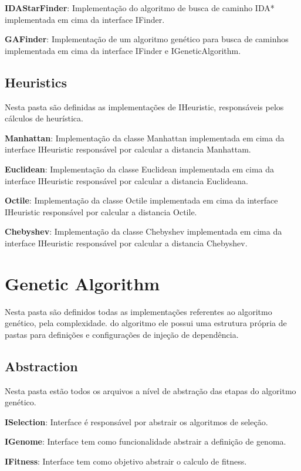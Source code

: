  \textbf{IDAStarFinder}: Implementação do algoritmo de busca de caminho IDA* implementada em cima da interface IFinder.
 
 \textbf{GAFinder}: Implementação de um algoritmo genético para busca de caminhos implementada em cima da interface IFinder e IGeneticAlgorithm.
 
 \subsection{Heuristics}
 
 Nesta pasta são definidas as implementações de IHeuristic, responsáveis pelos cálculos de heurística.
 
 \textbf{Manhattan}: Implementação da classe Manhattan implementada em cima da interface IHeuristic responsável por calcular a distancia Manhattam.
 
 \textbf{Euclidean}: Implementação da classe Euclidean implementada em cima da interface IHeuristic responsável por calcular a distancia Euclideana.
 
 \textbf{Octile}: Implementação da classe Octile implementada em cima da interface IHeuristic responsável por calcular a distancia Octile.
 
 \textbf{Chebyshev}: Implementação da classe Chebyshev implementada em cima da interface IHeuristic responsável por calcular a distancia Chebyshev.
 
 \section{Genetic Algorithm}
 
 Nesta pasta são definidos todas as implementações referentes ao algoritmo genético, pela complexidade.
 do algoritmo ele possui uma estrutura própria de pastas para definições e configurações de injeção de dependência.
 
 \subsection{Abstraction}
 
 Nesta pasta estão todos os arquivos a nível de abstração das etapas do algoritmo genético.
 
 \textbf{ISelection}: Interface é responsável por abstrair os algoritmos de seleção.
 
 \textbf{IGenome}: Interface tem como funcionalidade abstrair a definição de genoma.
 
 \textbf{IFitness}: Interface tem como objetivo abstrair o calculo de fitness.
 
